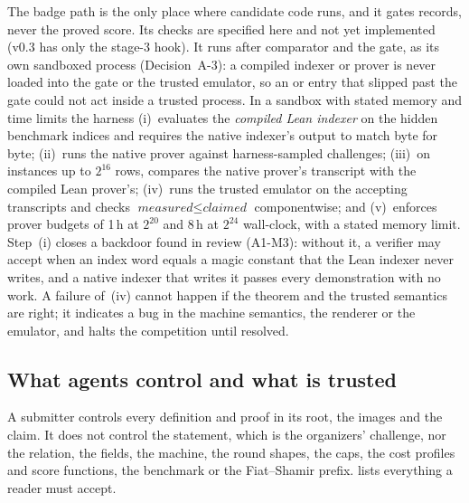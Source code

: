 The badge path is the only place where candidate code runs, and it gates records, never the
proved score. Its checks are specified here and not yet implemented (v0.3 has only the stage-3
hook). It runs after comparator and the gate, as its own sandboxed process (Decision~A-3):
a compiled indexer or prover is never loaded into the gate or the trusted emulator, so an
 or  entry that slipped past the gate could not act inside a trusted process.
In a sandbox with stated memory and time limits the harness (i)~evaluates the
\emph{compiled Lean indexer} on the hidden benchmark indices and requires the native indexer's
output to match byte for byte; (ii)~runs the native prover against harness-sampled challenges;
(iii)~on instances up to $2^{16}$ rows, compares the native prover's transcript with the compiled
Lean prover's; (iv)~runs the trusted emulator on the accepting transcripts and checks
$\textit{measured} \le \textit{claimed}$ componentwise; and (v)~enforces prover budgets of 1\,h
at $2^{20}$ and 8\,h at $2^{24}$ wall-clock, with a stated memory limit. Step~(i) closes a backdoor
found in review (A1-M3): without it, a verifier may accept when an index word equals a magic
constant that the Lean indexer never writes, and a native indexer that writes it passes every
demonstration with no work. A failure of~(iv) cannot happen if the theorem and the trusted
semantics are right; it indicates a bug in the machine semantics, the renderer or the emulator, and
halts the competition until resolved.

\subsection{What agents control and what is trusted}\label{subsec:arch-trusted}

A submitter controls every definition and proof in its root, the images and the claim. It does not
control the statement, which is the organizers' challenge, nor the relation, the fields, the
machine, the round shapes, the caps, the cost profiles and score functions, the benchmark or the
Fiat--Shamir prefix.
 lists everything a reader must accept.

